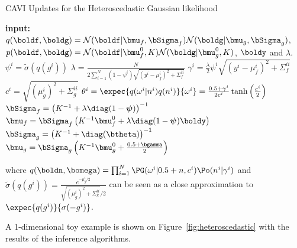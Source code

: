 \begin{algorithm}[H]
    \caption{\ac{CAVI} Updates for the Heteroscedastic Gaussian likelihood}
    \begin{algorithmic}
        \State \textbf{input:} $q(\boldf,\boldg) = \mathcal{N}(\boldf|\bmu_f,\bSigma_f)\mathcal{N}(\boldg|\bmu_g,\bSigma_g)$, $p(\boldf,\boldg) = \mathcal{N}(\boldf|\bmu^0_f, K)\mathcal{N}(\boldg|\bmu^0_g, K)$, $\boldy$ and $\lambda$.
            \State $\psi^i = \widetilde{\sigma}(q(g^i))$
            \State $\lambda = \frac{N}{2 \sum_{i=1}^N (1 - \psi^i)\sqrt{(y^i - \mu_f^i)^2 + \Sigma_f^{ii}}}$
            \State $\gamma^i = \frac{\lambda}{2} \psi^i  \sqrt{(y^i - \mu_f^i)^2 + \Sigma_f^{ii}}$
            \State $c^i = \sqrt{(\mu_g^i)^2 + \Sigma^{ii}_g}$
            \State $\theta^i = \expec{q(\omega^i|n^i)q(n^i)}{\omega^i} = \frac{0.5 + \gamma^i}{2c^i}\tanh\left(\frac{c^i}{2}\right)$
            \State $\bSigma_f = \left(K^{-1} + \lambda\diag(1-\boldsymbol{\psi})\right)^{-1}$
            \State $\bmu_f = \bSigma_f\left(K^{-1}\bmu_f^0 + \lambda\diag(1 - \boldsymbol{\psi}) \boldy\right)$
            \State $\bSigma_g = \left(K^{-1} + \diag(\btheta)\right)^{-1}$
            \State $\bmu_g = \bSigma_g\left(K^{-1}\bmu_g^0 + \frac{0.5 + \bgamma}{2}\right)$
        \EndWhile
    \end{algorithmic}
    where $q(\boldn, \bomega) = \prod_{i=1}^N \PG(\omega^i|0.5 + n, c^i)\Po(n^i|\gamma^i)$ and $\widetilde{\sigma}(q(g^i)) = \frac{e^{-\mu_g^i/2}}{\sqrt{(\mu_g^i)^2 + \Sigma^{ii}_k} / 2}$ can be seen as a close approximation to $\expec{q(g^i)}{\sigma(-g^i)}$.
    \label{alg:cavi_hetero}
\end{algorithm}



A 1-dimensional toy example is shown on Figure~\ref{fig:heteroscedastic} with the results of the inference algorithms.

